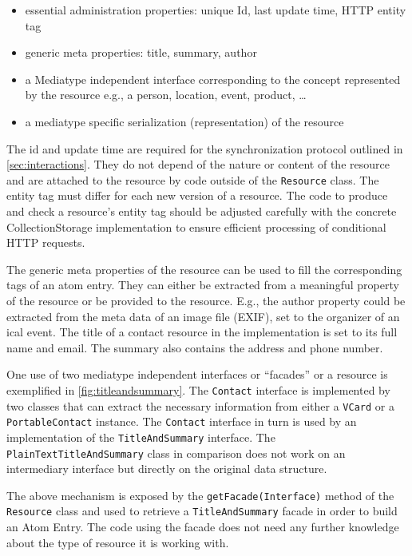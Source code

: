 \documentclass[12pt,a4paper,twoside]{scrartcl}		%
\begin{document}
\begin{itemize}
\item essential administration properties: unique Id, last update time, HTTP
  entity tag
\item generic meta properties: title, summary, author
\item a Mediatype independent interface corresponding to the concept represented
  by the resource e.g., a person, location, event, product, \ldots
\item a mediatype specific serialization (representation) of the resource
\end{itemize}

The id and update time are required for the synchronization protocol outlined in
\autoref{sec:interactions}. They do not depend of the nature or content of the
resource and are attached to the resource by code outside of the
\lstinline:Resource: class. The entity tag must differ for each new version of a
resource. The code to produce and check a resource's entity tag should be
adjusted carefully with the concrete CollectionStorage implementation to ensure
efficient processing of conditional HTTP requests.

The generic meta properties of the resource can be used to fill the
corresponding tags of an atom entry. They can either be extracted from a
meaningful property of the resource or be provided to the resource. E.g., the
author property could be extracted from the meta data of an image file (EXIF),
set to the organizer of an ical event. The title of a contact resource in the
implementation is set to its full name and email. The summary also contains the
address and phone number.

One use of two mediatype independent interfaces or ``facades'' or a resource is
exemplified in \autoref{fig:titleandsummary}. The \lstinline:Contact: interface
is implemented by two classes that can extract the necessary information from
either a \lstinline:VCard: or a \lstinline:PortableContact: instance. The
\lstinline:Contact: interface in turn is used by an implementation of the
\lstinline:TitleAndSummary: interface. The \lstinline:PlainTextTitleAndSummary:
class in comparison does not work on an intermediary interface but directly on
the original data structure.

The above mechanism is exposed by the \lstinline:getFacade(Interface): method of
the \lstinline:Resource: class and used to retrieve a
\lstinline:TitleAndSummary: facade in order to build an Atom Entry. The code
using the facade does not need any further knowledge about the type of resource
it is working with.
\end{document}
